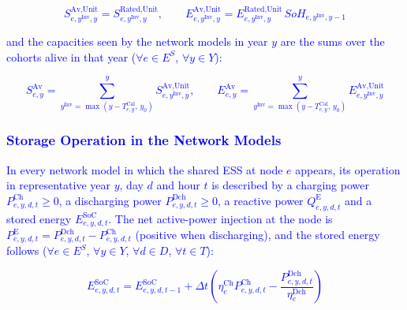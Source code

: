 \textcolor{blue}{
    \begin{equation}
        S^{\text{Av,Unit}}_{e,y^\text{Inv},y} = S^{\text{Rated,Unit}}_{e,y^\text{Inv},y}, \qquad
        E^{\text{Av,Unit}}_{e,y^\text{Inv},y} = E^{\text{Rated,Unit}}_{e,y^\text{Inv},y}\, SoH_{e,y^\text{Inv},y-1}
        \label{eq:cohort_available}
    \end{equation}
}


\textcolor{blue}{and the capacities seen by the network models in year $y$ are the sums over the cohorts
alive in that year ($\forall e \in E^S$, $\forall y \in Y$):}

\textcolor{blue}{
    \begin{equation}
        S^{\text{Av}}_{e,y} = \sum_{y^\text{Inv}=\max(y-T^\text{Cal}_{e,y},\,y_0)}^{y} S^{\text{Av,Unit}}_{e,y^\text{Inv},y},
        \qquad
        E^{\text{Av}}_{e,y} = \sum_{y^\text{Inv}=\max(y-T^\text{Cal}_{e,y},\,y_0)}^{y} E^{\text{Av,Unit}}_{e,y^\text{Inv},y}
        \label{eq:available_capacity}
    \end{equation}
}


\subsubsection{\textcolor{blue}{Storage Operation in the Network Models}}

\textcolor{blue}{In every network model in which the shared ESS at node $e$ appears, its operation in
representative year $y$, day $d$ and hour $t$ is described by a charging power $P^{\text{Ch}}_{e,y,d,t} \ge 0$,
a discharging power $P^{\text{Dch}}_{e,y,d,t} \ge 0$, a reactive power $Q^{\text{E}}_{e,y,d,t}$ and a stored
energy $E^{\text{SoC}}_{e,y,d,t}$. The net active-power injection at the node is
$P^{\text{E}}_{e,y,d,t} = P^{\text{Dch}}_{e,y,d,t} - P^{\text{Ch}}_{e,y,d,t}$ (positive when discharging), and
the stored energy follows ($\forall e \in E^S$, $\forall y \in Y$, $\forall d \in D$, $\forall t \in T$):}

\textcolor{blue}{
    \begin{equation}
        E^{\text{SoC}}_{e,y,d,t} = E^{\text{SoC}}_{e,y,d,t-1}
        + \Delta t \left( \eta^{\text{Ch}}_e P^{\text{Ch}}_{e,y,d,t} - \frac{P^{\text{Dch}}_{e,y,d,t}}{\eta^{\text{Dch}}_e} \right)
        \label{eq:soc_recursion}
    \end{equation}
}

